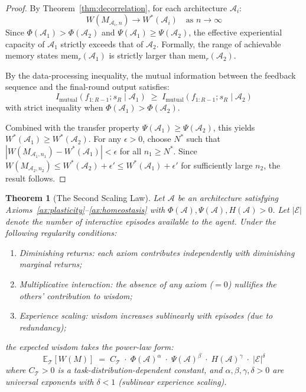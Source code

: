 \documentclass{article}
\newtheorem{theorem}{Theorem}
\newcommand{\cA}{\mathcal{A}}
\newcommand{\cT}{\mathcal{T}}
\newcommand{\cE}{\mathcal{E}}
\newcommand{\E}{\mathbb{E}}
\begin{document}
\begin{proof}
By Theorem~\ref{thm:decorrelation}, for each architecture $\cA_i$:
\[
    W(M_{\cA_i, n}) \to W^*(\cA_i) \quad \text{as } n \to \infty
\]
Since $\Phi(\cA_1) > \Phi(\cA_2)$ and $\Psi(\cA_1) \geq \Psi(\cA_2)$, the effective experiential capacity of $\cA_1$ strictly exceeds that of $\cA_2$.
Formally, the range of achievable memory states $\text{mem}_r(\cA_1)$ is strictly larger than $\text{mem}_r(\cA_2)$.

By the data-processing inequality, the mutual information between the feedback sequence and the final-round output satisfies:
\[
    I_{\text{mutual}}(f_{1:R-1}; s_R \mid \cA_1) \;\geq\; I_{\text{mutual}}(f_{1:R-1}; s_R \mid \cA_2)
\]
with strict inequality when $\Phi(\cA_1) > \Phi(\cA_2)$.

Combined with the transfer property $\Psi(\cA_1) \geq \Psi(\cA_2)$, this yields $W^*(\cA_1) \geq W^*(\cA_2)$.
For any $\epsilon > 0$, choose $N^*$ such that $|W(M_{\cA_1, n_1}) - W^*(\cA_1)| < \epsilon$ for all $n_1 \geq N^*$.
Since $W(M_{\cA_2, n_2}) \leq W^*(\cA_2) + \epsilon' \leq W^*(\cA_1) + \epsilon'$ for sufficiently large $n_2$, the result follows.
\end{proof}

\begin{theorem}[The Second Scaling Law]
\label{thm:scaling}
Let $\cA$ be an architecture satisfying Axioms~\ref{ax:plasticity}--\ref{ax:homeostasis} with $\Phi(\cA), \Psi(\cA), H(\cA) > 0$.
Let $|\cE|$ denote the number of interactive episodes available to the agent.
Under the following regularity conditions:
\begin{enumerate}[label=(\roman*),itemsep=1pt]
    \item \emph{Diminishing returns}: each axiom contributes independently with diminishing marginal returns;
    \item \emph{Multiplicative interaction}: the absence of any axiom ($=0$) nullifies the others' contribution to wisdom;
    \item \emph{Experience scaling}: wisdom increases sublinearly with episodes (due to redundancy);
\end{enumerate}
the expected wisdom takes the power-law form:
\begin{equation}
\boxed{
    \E_\cT[W(M)] \;=\; C_\cT \;\cdot\; \Phi(\cA)^{\alpha} \;\cdot\; \Psi(\cA)^{\beta} \;\cdot\; H(\cA)^{\gamma} \;\cdot\; |\cE|^{\delta}
}
\label{eq:wisdom_scaling_law}
\end{equation}
where $C_\cT > 0$ is a task-distribution-dependent constant, and $\alpha, \beta, \gamma, \delta > 0$ are universal exponents with $\delta < 1$ (sublinear experience scaling).
\end{theorem}
\end{document}
